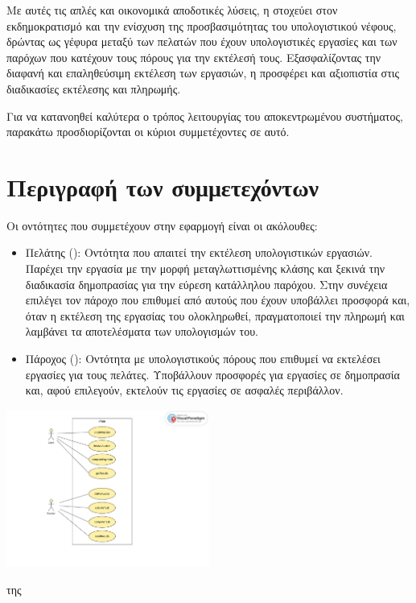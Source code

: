 Με αυτές τις απλές και οικονομικά αποδοτικές λύσεις, η  στοχεύει στον εκδημοκρατισμό και την ενίσχυση της προσβασιμότητας του υπολογιστικού νέφους, δρώντας ως γέφυρα μεταξύ των πελατών που έχουν υπολογιστικές εργασίες και των παρόχων που κατέχουν τους πόρους για την εκτέλεσή τους. Εξασφαλίζοντας την διαφανή και επαληθεύσιμη εκτέλεση των εργασιών, η  προσφέρει και αξιοπιστία στις διαδικασίες εκτέλεσης και πληρωμής.

Για να κατανοηθεί καλύτερα ο τρόπος λειτουργίας του αποκεντρωμένου συστήματος, παρακάτω προσδιορίζονται οι κύριοι συμμετέχοντες σε αυτό.

\section{Περιγραφή των συμμετεχόντων}
Οι οντότητες που συμμετέχουν στην εφαρμογή είναι οι ακόλουθες:
\begin{itemize}
    \item Πελάτης (): Οντότητα που απαιτεί την εκτέλεση υπολογιστικών εργασιών. 
    Παρέχει την εργασία με την μορφή μεταγλωττισμένης κλάσης  και ξεκινά την διαδικασία δημοπρασίας για την εύρεση κατάλληλου παρόχου. Στην συνέχεια επιλέγει τον πάροχο που επιθυμεί από αυτούς που έχουν υποβάλλει προσφορά και, όταν η εκτέλεση της εργασίας του ολοκληρωθεί, πραγματοποιεί την πληρωμή και λαμβάνει τα αποτελέσματα των υπολογισμών του.
    \item Πάροχος (): Οντότητα με υπολογιστικούς πόρους που επιθυμεί να εκτελέσει εργασίες για τους πελάτες. Υποβάλλουν προσφορές για εργασίες σε δημοπρασία και, αφού επιλεγούν, εκτελούν τις εργασίες σε ασφαλές περιβάλλον.
\end{itemize}    

\begin{illustration}
    \centering
    \includegraphics[width=0.5\textwidth]{figures/figure-003.pdf}
    \caption{ της } 
\end{illustration}

